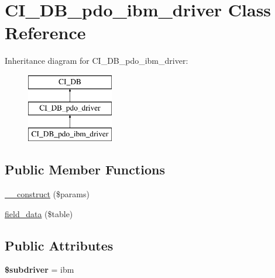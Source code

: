 \hypertarget{class_c_i___d_b__pdo__ibm__driver}{}\section{C\+I\+\_\+\+D\+B\+\_\+pdo\+\_\+ibm\+\_\+driver Class Reference}
\label{class_c_i___d_b__pdo__ibm__driver}
Inheritance diagram for C\+I\+\_\+\+D\+B\+\_\+pdo\+\_\+ibm\+\_\+driver\+:\begin{figure}[H]
\begin{center}
\leavevmode
\includegraphics[height=3.000000cm]{class_c_i___d_b__pdo__ibm__driver}
\end{center}
\end{figure}
\subsection*{Public Member Functions}
\begin{DoxyCompactItemize}
\item 
\mbox{\hyperlink{class_c_i___d_b__pdo__ibm__driver_ac82af58a00cd39a4227d11b6e541f02d}{\+\_\+\+\_\+construct}} (\$params)
\item 
\mbox{\hyperlink{class_c_i___d_b__pdo__ibm__driver_a8ecbb856e745ca393491e4b0142638b9}{field\+\_\+data}} (\$table)
\end{DoxyCompactItemize}
\subsection*{Public Attributes}
\begin{DoxyCompactItemize}
\item 
\mbox{\label{class_c_i___d_b__pdo__ibm__driver_a7c56966fb451032835e78c9e835a90a2}} 
{\bfseries \$subdriver} = \textquotesingle{}ibm\textquotesingle{}
\end{DoxyCompactItemize}
